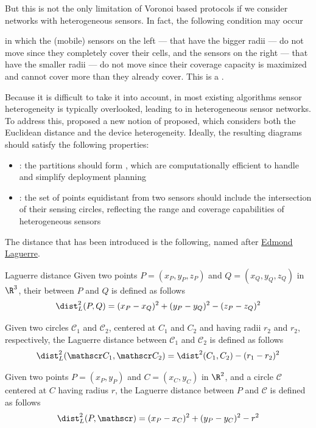 \documentclass[a4paper, 12pt]{report}
\begin{document}
    But this is not the only limitation of Voronoi based protocols if we consider networks with heterogeneous sensors. In fact, the following condition may occur 


    in which the (mobile) sensors on the left --- that have the bigger radii --- do not move since they completely cover their cells, and the sensors on the right --- that have the smaller radii --- do not move since their coverage capacity is maximized and cannot cover more than they already cover. This is a .

    Because it is difficult to take it into account, in most existing algorithms sensor heterogeneity is typically overlooked, leading to  in heterogeneous sensor networks. To address this, \textcite{blaschke} proposed a new notion of  proposed, which considers both the Euclidean distance and the device heterogeneity. Ideally, the resulting diagrams should satisfy the following properties:

    \begin{itemize}
        \item {}: the partitions should form , which are computationally efficient to handle and simplify deployment planning
        \item {}: the set of points equidistant from two sensors should include the intersection of their sensing circles, reflecting the range and coverage capabilities of heterogeneous sensors
    \end{itemize}

    The distance that has been introduced is the following, named after \href{https://en.wikipedia.org/wiki/Edmond_Laguerre}{Edmond Laguerre}.

    \begin{frameddefn}{Laguerre distance}
        Given two points $P=(x_P, y_P, z_P)$ and $Q=(x_Q, y_Q, z_Q)$ in $\R^3$, their  between $P$ and $Q$ is defined as follows $$\dist_L^2(P, Q) = (x_P - x_Q) ^2 + (y_P - y_Q)^2 - (z_P - z_Q)^2$$

        Given two circles $\mathscr C_1$ and $\mathscr C_2$, centered at $C_1$ and $C_2$ and having radii $r_2$ and $r_2$, respectively, the Laguerre distance between $\mathscr C_1$ and $\mathscr C_2$ is defined as follows $$\dist_L^2(\mathscr C_1, \mathscr C_2) = \dist^2(C_1, C_2) - (r_1 - r_2)^2$$

        Given two points $P = (x_P, y_P)$ and $C = (x_C, y_C)$ in $\R^2$, and a circle $\mathscr C$ centered at $C$ having radius $r$, the Laguerre distance between $P$ and $\mathscr C$ is defined as follows $$\dist_L^2(P, \mathscr) = (x_P - x_C)^2 + (y_P - y_C)^2 - r^2$$
    \end{frameddefn}
\end{document}
